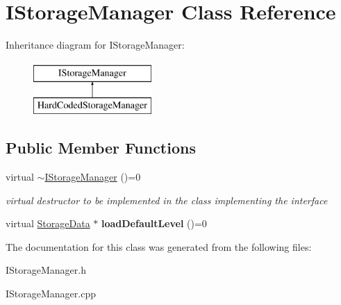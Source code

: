 \hypertarget{class_i_storage_manager}{}\section{I\+Storage\+Manager Class Reference}
\label{class_i_storage_manager}
Inheritance diagram for I\+Storage\+Manager\+:\begin{figure}[H]
\begin{center}
\leavevmode
\includegraphics[height=2.000000cm]{class_i_storage_manager}
\end{center}
\end{figure}
\subsection*{Public Member Functions}
\begin{DoxyCompactItemize}
\item 
\mbox{\label{class_i_storage_manager_a5e3d6fa4a26ce40e4a23a13138a2c055}} 
virtual \mbox{\hyperlink{class_i_storage_manager_a5e3d6fa4a26ce40e4a23a13138a2c055}{$\sim$\+I\+Storage\+Manager}} ()=0
\begin{DoxyCompactList}\small\item\em virtual destructor to be implemented in the class implementing the interface \end{DoxyCompactList}\item 
\mbox{\label{class_i_storage_manager_a8b8e56ec32e4780a5fda9fa26e18a70c}} 
virtual \mbox{\hyperlink{class_storage_data}{Storage\+Data}} $\ast$ {\bfseries load\+Default\+Level} ()=0
\end{DoxyCompactItemize}


The documentation for this class was generated from the following files\+:\begin{DoxyCompactItemize}
\item 
I\+Storage\+Manager.\+h\item 
I\+Storage\+Manager.\+cpp\end{DoxyCompactItemize}
